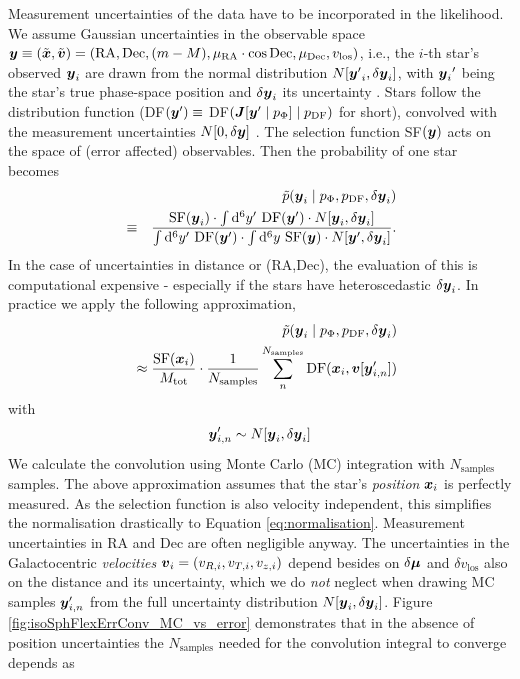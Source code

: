 
Measurement uncertainties of the data have to be incorporated in the likelihood. We assume Gaussian uncertainties in the observable space $\boldsymbol{y} \equiv (\tilde{\boldsymbol{x}},\tilde{\boldsymbol{v}})=(\text{RA},\text{Dec},(m-M),\mu_\text{RA} \cdot \cos \text{Dec},\mu_\text{Dec},v_\text{los})$, i.e., the $i$-th star's observed $\boldsymbol{y}_i$ are drawn from the normal distribution $N[{\boldsymbol{y}'}_i,\delta \boldsymbol{y}_i]$, with ${\boldsymbol{y}_i}'$ being the star's true phase-space position and $\delta \boldsymbol{y}_i$ its uncertainty . Stars follow the distribution function (DF$(\boldsymbol{y}') \equiv$ DF$(\boldsymbol{J}[\boldsymbol{y}' \mid p_\Phi] \mid p_\text{DF})$ for short), convolved with the measurement uncertainties $N[0,\delta \boldsymbol{y}]$ . The selection function SF$(\boldsymbol{y})$ acts on the space of (error affected) observables. Then the probability of one star becomes
\begin{eqnarray*}
&&\tilde{p}(\boldsymbol{y}_i \mid p_\Phi,p_\text{DF},\delta \boldsymbol{y}_i)\\
& \equiv& \frac{\text{SF}(\boldsymbol{y}_i) \cdot \int \mathop{}\!\mathrm{d^6} y' \  \text{DF}(\boldsymbol{y}') \cdot N[\boldsymbol{y}_i,\delta \boldsymbol{y}_i]}{\int \mathop{}\!\mathrm{d^6}y'  \  \text{DF}(\boldsymbol{y}')  \cdot  \int \mathop{}\!\mathrm{d^6} y \  \text{SF}(\boldsymbol{y})  \cdot N[\boldsymbol{y}',\delta \boldsymbol{y}_i]}.
\end{eqnarray*}
In the case of uncertainties in distance or (RA,Dec), the evaluation of this is computational expensive - especially if the stars have heteroscedastic $\delta \boldsymbol{y}_i$. In practice we apply the following approximation,
\begin{eqnarray}
&&\tilde{p}(\boldsymbol{y}_i \mid p_\Phi,p_\text{DF},\delta \boldsymbol{y}_i) \nonumber\\
&&\approx \frac{ \text{SF}(\boldsymbol{x}_i)}{M_\text{tot}} \cdot \frac{1}{N_\text{samples}} \sum_n^{N_\text{samples}}  \text{DF}(\boldsymbol{x}_i,\boldsymbol{v}[\boldsymbol{y}'_{i,n}]) \label{eq:errorconv}
\end{eqnarray}
with
\begin{eqnarray}
\boldsymbol{y}'_{i,n} \sim N[\boldsymbol{y}_i,\delta \boldsymbol{y}_i]\nonumber
\end{eqnarray}
We calculate the convolution using Monte Carlo (MC) integration with $N_\text{samples}$ samples. The above approximation assumes that the star's \emph{position} $\boldsymbol{x}_i$ is perfectly measured. As the selection function is also velocity independent, this simplifies the normalisation drastically to Equation \ref{eq:normalisation}. Measurement uncertainties in $\mathrm{RA}$ and $\mathrm{Dec}$ are often negligible anyway. The uncertainties in the Galactocentric \emph{velocities} $\boldsymbol{v}_i = (v_{R,i},v_{T,i},v_{z,i})$ depend besides on $\delta \boldsymbol{\mu}$ and $\delta v_\text{los}$ also on the distance and its uncertainty, which we do \emph{not} neglect when drawing MC samples $\boldsymbol{y}'_{i,n}$ from the full uncertainty distribution $N[\boldsymbol{y}_i,\delta \boldsymbol{y}_i]$. Figure \ref{fig:isoSphFlexErrConv_MC_vs_error} demonstrates that in the absence of position uncertainties the $N_\text{samples}$ needed for the convolution integral to converge depends as
